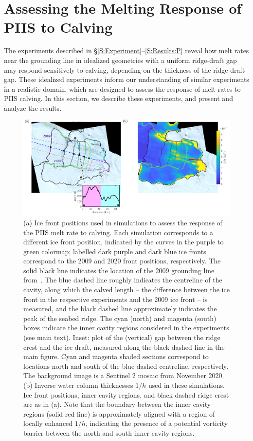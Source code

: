 \documentclass[draft]{agujournal2019}
\begin{document}
\section{Assessing the Melting Response of PIIS to Calving}\label{S:Realistic}
The experiments described in \S\ref{S:Experiment}--\ref{S:Results:P} reveal how melt rates near the grounding line in idealized geometries with a uniform ridge-draft gap may respond sensitively to calving, depending on the thickness of the ridge-draft gap. These idealized experiments inform our understanding of similar experiments in a realistic domain, which are designed to assess the response of melt rates to PIIS calving. In this section, we describe these experiments, and present and analyze the results.

\begin{figure}
    \centering
    \includegraphics[width =\textwidth]{../make_figures/plots/figure10.pdf}
    \caption{(a) Ice front positions used in simulations to assess the response of the PIIS melt rate to calving. Each simulation corresponds to a different ice front position, indicated by the curves in the purple to green colormap; labelled dark purple and dark blue ice fronts correspond to the 2009 and 2020 front positions, respectively. The solid black line indicates the location of the 2009 grounding line from~. The blue dashed line roughly indicates the centreline of the cavity, along which the calved length -- the difference between the ice front in the respective experiments and the 2009 ice front -- is measured, and the black dashed line approximately indicates the peak of the seabed ridge. The cyan (north) and magenta (south) boxes indicate the inner cavity regions considered in the experiments (see main text). Inset: plot of the (vertical) gap between the ridge crest and the ice draft, measured along the black dashed line in the main figure. Cyan and magenta shaded sections correspond to locations north and south of the blue dashed centreline, respectively. The background image is a Sentinel 2 mosaic from November 2020. (b) Inverse water column thicknesses $1/h$ used in these simulations. Ice front positions, inner cavity regions, and black dashed ridge crest are as in (a).  Note that the boundary between the inner cavity regions (solid red line) is approximately aligned with a region of locally enhanced $1/h$, indicating the presence of a potential vorticity barrier between the north and south inner cavity regions.}
    \label{fig:figure10}
\end{figure}
\end{document}

